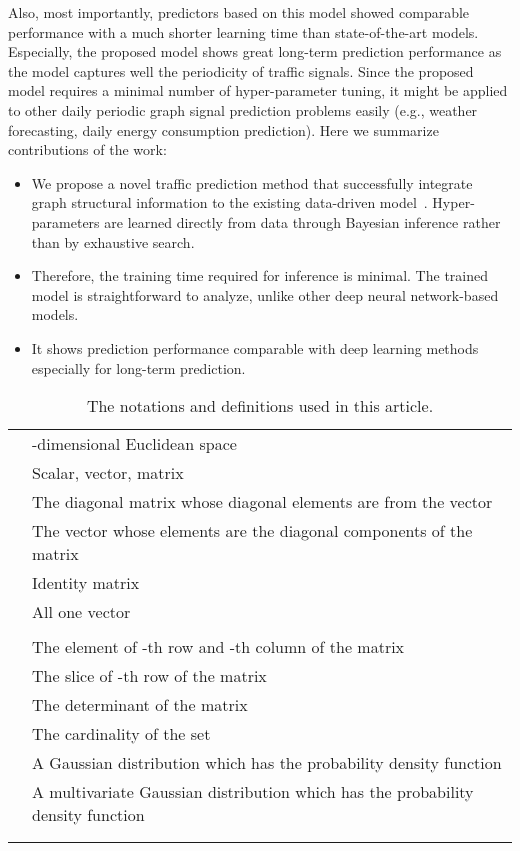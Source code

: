 \documentclass[journal]{IEEEtran}
\begin{document}
Also, most importantly, predictors based on this model showed comparable performance with a much shorter learning time than state-of-the-art models.
Especially, the proposed model shows great long-term prediction performance as the model captures well the periodicity of traffic signals.
Since the proposed model requires a minimal number of hyper-parameter tuning, it might be applied to other daily periodic graph signal prediction problems easily (e.g., weather forecasting, daily energy consumption prediction).
Here we summarize contributions of the work:
\begin{itemize}
    \item We propose a novel traffic prediction method that successfully integrate graph structural information to the existing data-driven model~\cite{kwak2020travel}. 
    Hyper-parameters are learned directly from data through Bayesian inference rather than by exhaustive search.
    \item Therefore, the training time required for inference is minimal. The trained model is straightforward to analyze, unlike other deep neural network-based models.
    \item It shows prediction performance comparable with deep learning methods especially for long-term prediction.
\end{itemize}

\begin{table}[t!]
\caption{The notations and definitions used in this article.}\label{table:definitions}
\renewcommand{\arraystretch}{1.3}
\begin{tabular}{p{1.5cm} p{6.5cm} }
\toprule
 & -dimensional Euclidean space\\ 
 & Scalar, vector, matrix\\
 & The diagonal matrix whose diagonal elements are from the vector \\
 & The vector whose elements are the diagonal components of the matrix \\
 & Identity matrix\\
 & All one vector\\
 & \\
 & The element of -th row and -th column of the matrix \\
 & The slice of -th row of the matrix  \\
 & The determinant of the matrix \\
 & The cardinality of the set \\
 & A Gaussian distribution which has the probability density function  \\
 & A multivariate Gaussian distribution which has the probability density function \\
 & \\
 & \\
\bottomrule
\end{tabular}
\end{table}
\end{document}
